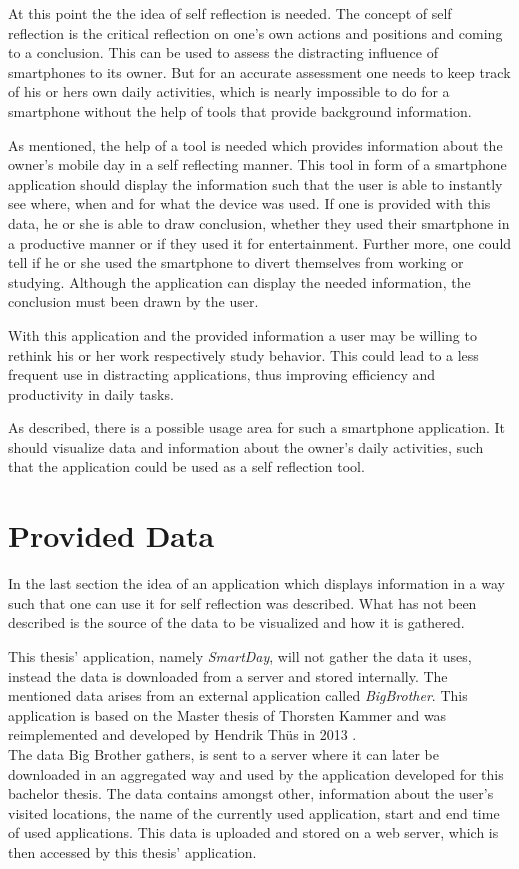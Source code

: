 At this point the the idea of self reflection is needed. The concept of self reflection is the critical reflection on one's own actions and positions and coming to a conclusion. This can be used to assess the distracting influence of smartphones to its owner. But for an accurate assessment one needs to keep track of his or hers own daily activities, which is nearly impossible to do for a smartphone without the help of tools that provide background information.

As  mentioned, the help of a tool is needed which provides information about the owner's mobile day in a self reflecting manner. This tool in form of a smartphone application should display the information such that the user is able to instantly see where, when and for what the device was used. If one is provided with this data, he or she is able to draw conclusion, whether they used their smartphone in a productive manner or if they used it for entertainment. Further more, one could tell if he or she used the smartphone to divert themselves from working or studying. Although the application can display the needed information, the conclusion must been drawn by the user.

With  this application and the provided information a user may be willing to rethink his or her work respectively study behavior. This could lead to a less frequent use in distracting applications, thus improving efficiency and productivity in daily tasks.

As described, there is a possible usage area for such a smartphone application. It should visualize data and information about the owner's daily activities, such that the application could be used as a self reflection tool.

\newpage
\section{Provided Data}
In the last section the idea of an application which displays information in a way such that one can use it for self reflection was described. What has not been described is the source of the data to be visualized and how it is gathered.

This  thesis' application, namely \emph{SmartDay}, will not gather the data it uses, instead the data is downloaded from a server and stored internally. The mentioned data arises from an external application called \emph{BigBrother}. This application is based on the Master thesis of Thorsten Kammer \cite{thorstensthesis} and was reimplemented and developed by Hendrik Th\"us in 2013 \cite{bigbrother}.\\
The data Big Brother gathers, is sent to a server where it can later be downloaded in an aggregated way and used by the application developed for this bachelor thesis. The data contains amongst other, information about the user's visited locations, the name of the currently used application, start and end time of used applications. This data is uploaded and stored on a web server, which is then accessed by this thesis' application.

